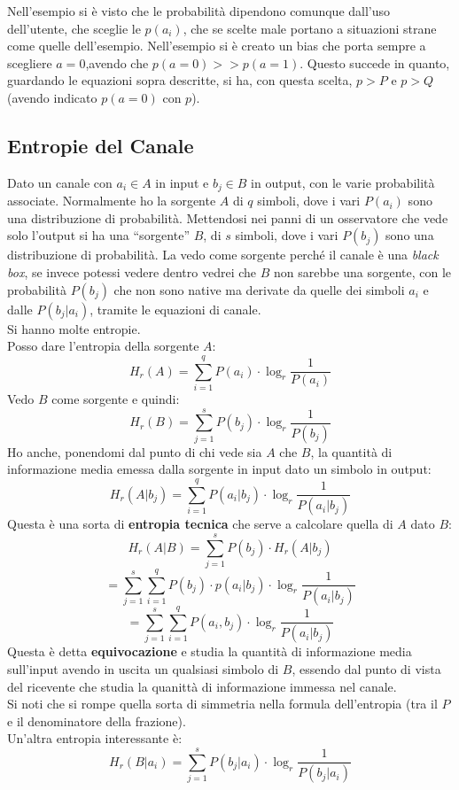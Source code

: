 \documentclass[a4paper,12pt, oneside]{book}
\begin{document}
Nell'esempio si è visto che le probabilità dipendono comunque dall'uso
dell'utente, che sceglie le $p(a_i)$, che se scelte male portano a situazioni
strane come quelle dell'esempio. Nell'esempio si è creato un bias che porta
sempre a scegliere $a=0$,avendo che $p(a=0)>>p(a=1)$. Questo succede in quanto,
guardando le equazioni sopra descritte, si ha, con questa scelta, $p>P$ e $p>Q$
(avendo indicato $p(a=0)$ con $p$).
\subsection{Entropie del Canale}
Dato un canale con $a_i\in A$ in input e $b_j\in B$ in output, con le varie
probabilità associate. Normalmente ho la sorgente $A$ di $q$ simboli, dove i
vari $P(a_i)$ sono una distribuzione di probabilità. Mettendosi 
nei panni di un osservatore che vede solo l'output si ha una ``sorgente'' $B$,
di $s$ simboli, dove i vari $P(b_j)$ sono una distribuzione di probabilità. La
vedo come sorgente perché il canale è una \textit{black box}, se invece potessi
vedere dentro vedrei che $B$ non sarebbe una sorgente, con le probabilità
$P(b_j)$ che non sono native ma derivate da quelle dei simboli $a_i$ e dalle
$P(b_j|a_i)$, tramite le equazioni di canale. \\
Si hanno molte entropie.\\
Posso dare l'entropia della sorgente $A$:
\[H_r(A)=\sum_{i=1}^q P(a_i)\cdot \log_r\frac{1}{P(a_i)}\]
Vedo $B$ come sorgente e quindi:
\[H_r(B)=\sum_{j=1}^s P(b_j)\cdot \log_r\frac{1}{P(b_j)}\]
Ho anche, ponendomi dal punto di chi vede sia $A$ che $B$, la quantità di
informazione media emessa dalla sorgente in input dato un simbolo in output:
\[H_r(A|b_j)=\sum_{i=1}^q P(a_i|b_j)\cdot \log_r\frac{1}{P(a_i|b_j)}\]
Questa è una sorta di \textbf{entropia tecnica} che serve a calcolare quella di
$A$ dato $B$:
\[H_r(A|B)=\sum_{j=1}^s P(b_j)\cdot H_r(A|b_j)\]
\[=\sum_{j=1}^s\sum_{i=1}^q P(b_j)\cdot p(a_i|b_j)\cdot
  \log_r\frac{1}{P(a_i|b_j)}\]
\[=\sum_{j=1}^s\sum_{i=1}^q P(a_i,b_j)\cdot \log_r\frac{1}{P(a_i|b_j)}\]
Questa è detta \textbf{equivocazione} e studia la quantità di informazione media
sull'input avendo in uscita un qualsiasi simbolo di $B$, essendo dal punto di
vista del ricevente che studia la quanittà di informazione immessa nel canale.\\
Si noti che si rompe quella sorta di simmetria nella formula dell'entropia (tra
il $P$ e il denominatore della frazione).\\
Un'altra entropia interessante è:
\[H_r(B|a_i)=\sum_{j=1}^s P(b_j|a_i)\cdot \log_r\frac{1}{P(b_j|a_i)}\]
\end{document}
